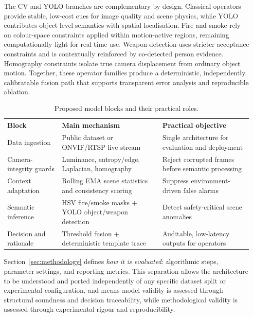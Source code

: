 \documentclass[sensors,article,submit,pdftex,moreauthors]{Definitions/mdpi}
\begin{document}
The CV and YOLO branches are complementary by design. Classical operators provide stable, low-cost cues for image quality and scene physics, while YOLO contributes object-level semantics with spatial localisation. Fire and smoke rely on colour-space constraints applied within motion-active regions, remaining computationally light for real-time use. Weapon detection uses stricter acceptance constraints and is contextually reinforced by co-detected person evidence. Homography constraints isolate true camera displacement from ordinary object motion. Together, these operator families produce a deterministic, independently calibratable fusion path that supports transparent error analysis and reproducible ablation.
 
\begin{table}[H]
\caption{Proposed model blocks and their practical roles.}
\label{tab:proposed-final-blocks}
\centering
\small
\setlength{\tabcolsep}{4pt}
\begin{tabular}{p{3.2cm} p{4.5cm} p{4.2cm}}
\toprule
\textbf{Block} & \textbf{Main mechanism} & \textbf{Practical objective} \\
\midrule
Data ingestion       & Public dataset or ONVIF/RTSP live stream & Single architecture for evaluation and deployment \\
Camera-integrity guards & Luminance, entropy/edge, Laplacian, homography & Reject corrupted frames before semantic processing \\
Context adaptation   & Rolling EMA scene statistics and consistency scoring & Suppress environment-driven false alarms \\
Semantic inference   & HSV fire/smoke masks + YOLO object/weapon detection & Detect safety-critical scene anomalies \\
Decision and rationale & Threshold fusion + deterministic template trace & Auditable, low-latency outputs for operators \\
\bottomrule
\end{tabular}
\end{table}
 
 Section~\ref{sec:methodology} defines \emph{how it is evaluated}: algorithmic steps, parameter settings, and reporting metrics. This separation allows the architecture to be understood and ported independently of any specific dataset split or experimental configuration, and means model validity is assessed through structural soundness and decision traceability, while methodological validity is assessed through experimental rigour and reproducibility.
 
\end{document}
